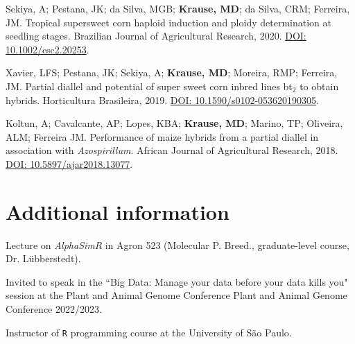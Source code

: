 \documentclass[]{mdkrause_cv_openfont}
\begin{document}
\begin{minipage}[t]{1\textwidth}
\sectionsep
Sekiya, A; Pestana, JK; da Silva, MGB; \textbf{Krause, MD}; da Silva, CRM; Ferreira, JM. Tropical supersweet corn haploid induction and ploidy determination at seedling stages. Brazilian Journal of Agricultural Research, 2020. \href{https://www.scielo.br/pdf/pab/v55/1678-3921-pab-55-e00968.pdf}{DOI: 10.1002/csc2.20253}. \ExternalLink 

\sectionsep
Xavier, LFS; Pestana, JK; Sekiya, A; \textbf{Krause, MD}; Moreira, RMP; Ferreira, JM. Partial diallel and potential of super sweet corn inbred lines bt$_2$ to obtain hybrids. Horticultura Brasileira, 2019. \href{http://www.scielo.br/scielo.php?script=sci_arttext&pid=S0102-05362019000300278}{DOI: 10.1590/s0102-053620190305}. \ExternalLink 

\sectionsep
Koltun, A; Cavalcante, AP; Lopes, KBA; \textbf{Krause, MD}; Marino, TP; Oliveira, ALM; Ferreira JM. Performance of maize hybrids from a partial diallel in association with \textit{Azospirillum}. African Journal of Agricultural Research, 2018. \href{https://academicjournals.org/journal/AJAR/article-abstract/B4A2A1B57541}{DOI: 10.5897/ajar2018.13077}. \ExternalLink

\sectionsep
{}

\sectionsep


\section{Additional information}

\sectionsep


\begin{tightemize}
	\vspace{3 mm}
	\item {} Lecture on \emph{AlphaSimR} in Agron 523 (Molecular P. Breed., graduate-level course, Dr. Lübberstedt). 
	\item {} Invited to speak in the ``Big Data: Manage your data before your data kills you" session at the Plant and Animal Genome Conference Plant and Animal Genome Conference 2022/2023.
	\item {} Instructor of \texttt{R} programming course at the University of São Paulo.
\end{tightemize}


\end{minipage}
\end{document}
